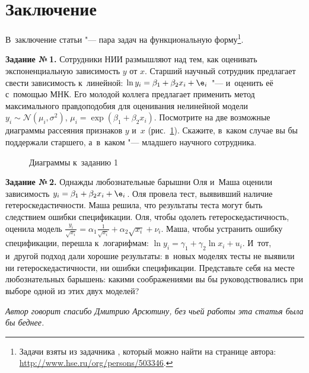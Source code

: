 \documentclass[11pt]{article}
\begin{document}
\section{Заключение}

В~заключение статьи "--- пара задач на функциональную форму\footnote{Задачи взяты из задачника \citet{FurmanovZMetr}, который можно найти на странице автора: \url{http://www.hse.ru/org/persons/503346}.}\fnnsp.

\par\medskip

\textbf{Задание №\,1.} Сотрудники НИИ размышляют над тем, как оценивать экспоненциальную зависимость $y$ от $x$. Старший научный сотрудник предлагает свести зависимость к~линейной: $\ln y_i = \beta_1 + \beta_2 x_i + \e_i$ "--- и~оценить её с~помощью МНК. Его молодой коллега предлагает применить метод максимального правдоподобия для оценивания нелинейной модели $y_i \sim \mathcal{N} (\mu_i, \sigma^2)$, $\mu_i = \exp(\beta_1 + \beta_2 x_i)$. Посмотрите на две возможные диаграммы рассеяния признаков $y$ и~$x$ (рис.~\ref{fig:diag}). Скажите, в~каком случае вы бы поддержали старшего, а~в~каком "--- младшего научного сотрудника.

\begin{figure}[htbp]
	\centering
	 \quad
	\caption{Диаграммы к~заданию 1}\label{fig:diag}
\end{figure}


\textbf{Задание №\,2.} Однажды любознательные барышни Оля и~Маша оценили зависимость $y_i = \beta_1 + \beta_2 x_i + \e_i$. Оля провела тест, выявивший наличие гетероскедастичности. Маша решила, что результаты теста могут быть следствием ошибки спецификации. Оля, чтобы одолеть гетероскедастичность, оценила модель $\frac{y_i}{\sqrt{x_i}} = \alpha_1 \frac{1}{\sqrt{x_i}} + \alpha_2 \sqrt{x_i} + \nu_i$. Маша, чтобы устранить ошибку спецификации, перешла к~логарифмам: $\ln y_i = \gamma_1 + \gamma_2 \ln x_i + u_i$. И~тот, и~другой подход дали хорошие результаты: в~новых моделях тесты не выявили ни гетероскедастичности, ни ошибки спецификации. Представьте себя на месте любознательных барышень: какими соображениями вы бы руководствовались при выборе одной из этих двух моделей?

\textit{Автор говорит спасибо Дмитрию Арсютину, без чьей работы эта статья была бы беднее.}

\nocite{sakia92}	

\printbibliography	
	
\end{document}
